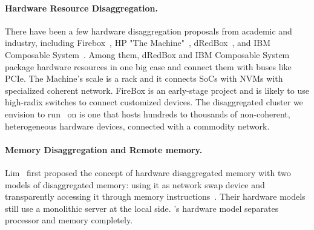 \documentclass[10pt,times,twocolumn]{z2-article}
\begin{document}
{{{{{{{\paragraph{Hardware Resource Disaggregation.}
There have been a few hardware disaggregation proposals from academic and industry,
including Firebox~\cite{FireBox-FASTKeynote}, HP "The Machine"~\cite{HP-TheMachine,HP-MemoryOS}, dRedBox~\cite{dRedBox-DATE},
and IBM Composable System~\cite{IBM-Composable}.
Among them, dRedBox and IBM Composable System package hardware resources in one big case 
and connect them with buses like PCIe.
The Machine's scale is a rack and it connects SoCs with NVMs with specialized coherent network.
FireBox is an early-stage project and is likely to use high-radix switches to connect  customized devices.
The disaggregated cluster we envision to run \lego\ on is one that hosts hundreds to thousands of
non-coherent, heterogeneous hardware devices, connected with a commodity network.

\paragraph{Memory Disaggregation and Remote memory.}
Lim \etal\ first proposed the concept of hardware disaggregated memory
with two models of disaggregated memory: using it as network swap device 
and transparently accessing it through memory instructions~\cite{Lim09-disaggregate,Lim12-HPCA}.
Their hardware models still use a monolithic server at the local side. 
\lego's hardware model separates processor and memory completely. %

}}}}}}}
\end{document}
